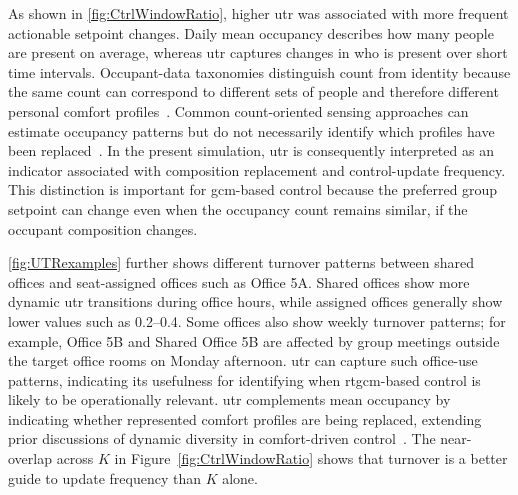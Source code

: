 As shown in \autoref{fig:CtrlWindowRatio}, higher \ac{utr} was associated with more frequent actionable setpoint changes.
Daily mean occupancy describes how many people are present on average, whereas \ac{utr} captures changes in who is present over short time intervals.
Occupant-data taxonomies distinguish count from identity because the same count can correspond to different sets of people and therefore different personal comfort profiles~\cite{nagy_ten_2023}.
Common count-oriented sensing approaches can estimate occupancy patterns but do not necessarily identify which profiles have been replaced~\cite{wang_modeling_2017}.
In the present simulation, \ac{utr} is consequently interpreted as an indicator associated with composition replacement and control-update frequency.
This distinction is important for \ac{gcm}-based control because the preferred group setpoint can change even when the occupancy count remains similar, if the occupant composition changes.

\autoref{fig:UTRexamples} further shows different turnover patterns between shared offices and seat-assigned offices such as Office 5A.
Shared offices show more dynamic \ac{utr} transitions during office hours, while assigned offices generally show lower values such as \qtyrange{0.2}{0.4}{}.
Some offices also show weekly turnover patterns; for example, Office 5B and Shared Office 5B are affected by group meetings outside the target office rooms on Monday afternoon.
\ac{utr} can capture such office-use patterns, indicating its usefulness for identifying when \ac{rtgcm}-based control is likely to be operationally relevant.
\ac{utr} complements mean occupancy by indicating whether represented comfort profiles are being replaced, extending prior discussions of dynamic diversity in comfort-driven control~\cite{jung_energy_2020}.
The near-overlap across $K$ in Figure~\ref{fig:CtrlWindowRatio} shows that turnover is a better guide to update frequency than $K$ alone.

